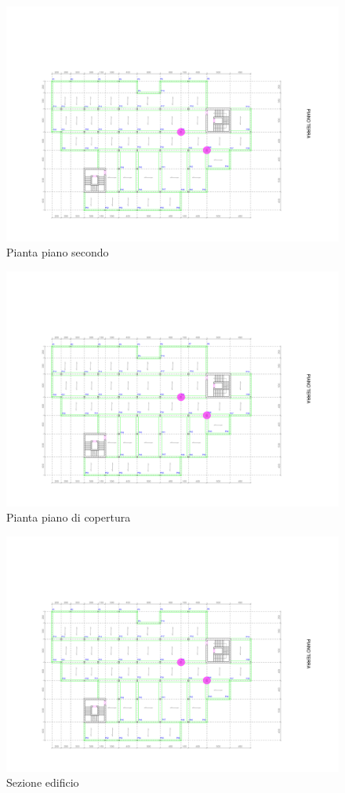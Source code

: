 \begin{figure}[hp]
    \centering
    \includegraphics[width=\textwidth, page=3]{IMG/PianteEdificio.pdf}
    \caption{Pianta piano secondo}
\end{figure}
\begin{figure}[hp]
    \centering
    \includegraphics[width=\textwidth, page=4]{IMG/PianteEdificio.pdf}
    \caption{Pianta piano di copertura}
\end{figure}
\begin{figure}[hp]
    \centering
    \includegraphics[width=\textwidth, page=5]{IMG/PianteEdificio.pdf}
    \caption{Sezione edificio}
\end{figure}


